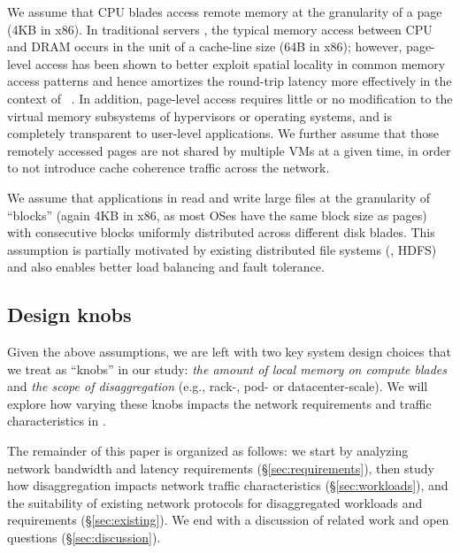 We assume that CPU blades access remote memory at the granularity of a page (4KB in x86). In traditional servers , the typical memory access between CPU and DRAM occurs in the unit of a cache-line size (64B in x86); however, page-level access has been shown to better exploit spatial locality in common memory access patterns and hence amortizes the round-trip latency more effectively in the context of \dis ~\cite{ddcHwDesign1}. In addition, page-level access requires little or no modification to the virtual memory subsystems of hypervisors or operating systems, and is completely transparent to user-level applications. We further assume that those remotely accessed pages are not shared by multiple VMs at a given time, in order to not introduce cache coherence traffic across the network.

We assume that applications in \dis read and write large files at the granularity of ``blocks'' (again 4KB in x86, as most OSes have the same block size as pages) with consecutive blocks uniformly distributed across different disk blades. This assumption is partially motivated by existing distributed file systems (\eg, HDFS) and also enables better load balancing and fault tolerance. %

\vspace{-0.1in}
\subsection{Design knobs}
\vspace{-0.05in}
\label{ssec:knobs}
Given the above assumptions, we are left with two key system design choices that we treat as ``knobs'' in our study: {\em the amount of local memory on compute blades} and  {\em the scope of disaggregation} (e.g., rack-, pod- or datacenter-scale). We will explore how varying these knobs impacts the network requirements and traffic characteristics in \dis.

The remainder of this paper is organized as follows: we start by analyzing network  bandwidth and latency requirements (\S\ref{sec:requirements}), then study how disaggregation impacts network traffic characteristics (\S\ref{sec:workloads}), and the suitability of existing network protocols for disaggregated workloads and requirements (\S\ref{sec:existing}). We end with a discussion of related work and open questions (\S\ref{sec:discussion}).



